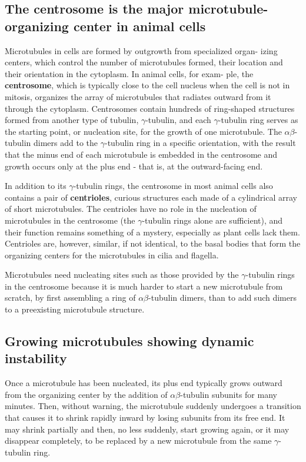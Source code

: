 \subsection{The centrosome is the major microtubule-organizing center in animal cells}

Microtubules in cells are formed by outgrowth from specialized organ-
izing centers, which control the number of microtubules formed, their
location and their orientation in the cytoplasm. In animal cells, for exam-
ple, the \textbf{centrosome}, which is typically close to the cell nucleus when the
cell is not in mitosis, organizes the array of microtubules that radiates
outward from it through the cytoplasm.
Centrosomes contain hundreds of ring-shaped structures formed from another type of
tubulin, $\gamma$-tubulin, and each $\gamma$-tubulin ring serves as the starting point, or
nucleation site, for the growth of one microtubule. The
$\alpha\beta$-tubulin dimers add to the $\gamma$-tubulin ring in a specific orientation, with
the result that the minus end of each microtubule is embedded in the
centrosome and growth occurs only at the plus end - that is, at the outward-facing end.

In addition to its $\gamma$-tubulin rings, the centrosome in most animal cells also
contains a pair of \textbf{centrioles}, curious structures each made of a cylindrical
array of short microtubules. The centrioles have no role in the nucleation
of microtubules in the centrosome (the $\gamma$-tubulin rings alone are sufficient),
and their function remains something of a mystery, especially as
plant cells lack them. Centrioles are, however, similar, if not identical, to
the basal bodies that form the organizing centers for the microtubules in
cilia and flagella.

Microtubules need nucleating sites such as those provided by the $\gamma$-tubulin
rings in the centrosome because it is much harder to start a new
microtubule from scratch, by first assembling a ring of $\alpha\beta$-tubulin dimers,
than to add such dimers to a preexisting microtubule structure.

\subsection{Growing microtubules showing dynamic instability}

Once a microtubule has been nucleated, its plus end typically grows outward
from the organizing center by the addition of $\alpha\beta$-tubulin subunits
for many minutes. Then, without warning, the microtubule suddenly
undergoes a transition that causes it to shrink rapidly inward by losing
subunits from its free end. It may shrink partially and then,
no less suddenly, start growing again, or it may disappear completely, to
be replaced by a new microtubule from the same $\gamma$-tubulin ring.

